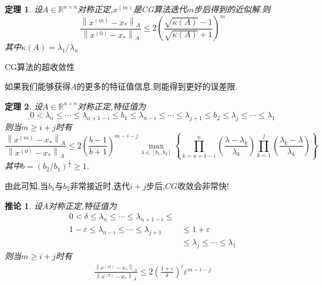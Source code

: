 \documentclass[notheorems,serif]{beamer}
\renewcommand{\normalsize}{\wuhao}
\newcommand{\wuhao}{\fontsize{10.5pt}{\baselineskip}\selectfont}
\newcommand{\hei}[1]{{\HEI#1}}
\newtheorem{theorem}{\hei{定理}}
\newtheorem{corollary}{\hei{推论}}
\begin{document}
\begin{frame}
\begin{theorem}
设$A \in \mathbb{R}^{n \times n}$对称正定,$x^{(m)}$是CG算法迭代$m$步后得到的近似解.则
$$
\frac{\left\|x^{(m)}-x_{*}\right\|_{A}}{\left\|x^{(0)}-x_{*}\right\|_{A}} \leq 2\left(\frac{\sqrt{\kappa(A)}-1}{\sqrt{\kappa(A)}+1}\right)^{m}
$$
其中$\kappa(A)=\lambda_{1} / \lambda_{n}$
\end{theorem}
\end{frame}


\begin{frame}


{\color{blue}\Large CG算法的超收敛性}

\quad

\normalsize
如果我们能够获得$A$的更多的特征值信息,则能得到更好的误差限.
\begin{theorem}
设$A \in \mathbb{R}^{n \times n}$对称正定,特征值为
$$
0<\lambda_{n} \leq \cdots \leq \lambda_{n+1-i} \leq b_{1} \leq \lambda_{n-i} \leq \cdots \leq \lambda_{j+1} \leq b_{2} \leq \lambda_{j} \leq \cdots \leq \lambda_{1}
$$
则当$m \geq i+j$时有
$$
\frac{\left\|x^{(m)}-x_{*}\right\|_{A}}{\left\|x^{(0)}-x_{*}\right\|_{A}} \leq 2\left(\frac{b-1}{b+1}\right)^{m-i-j} \max _{\lambda \in\left[b_{1}, b_{2}\right]}\left\{\prod_{k=n+1-i}^{n}\left(\frac{\lambda-\lambda_{k}}{\lambda_{k}}\right) \prod_{k=1}^{j}\left(\frac{\lambda_{k}-\lambda}{\lambda_{k}}\right)\right\}
$$
其中$b=\left(b_{2} / b_{1}\right)^{\frac{1}{2}} \geq 1$.
\end{theorem}
由此可知,当$b_1$与$b_2$非常接近时,迭代$i+j$步后,$CG$收敛会非常快!
\end{frame}

\begin{frame}
\begin{corollary}
设$A$对称正定,特征值为
$$
\begin{aligned} 0<\delta \leq \lambda_{n} \leq \cdots \leq \lambda_{n+1-i} \leq \\ 1-\varepsilon \leq \lambda_{n-i} \leq \cdots \leq \lambda_{j+1} & \leq 1+\varepsilon \\ & \leq \lambda_{j} \leq \cdots \leq \lambda_{1} \end{aligned}
$$
则当$m \geq i+j$时有
\begin{align*}
	\frac{\left\|x^{(m)}-x_{*}\right\|_{A}}{\left\|x^{(0)}-x_{*}\right\|_{A}} \leq 2\left(\frac{1+\varepsilon}{\delta}\right)^{i} \varepsilon^{m-i-j}
	\tag{7.16}
\end{align*}
\end{corollary}
\end{frame}
\end{document}
